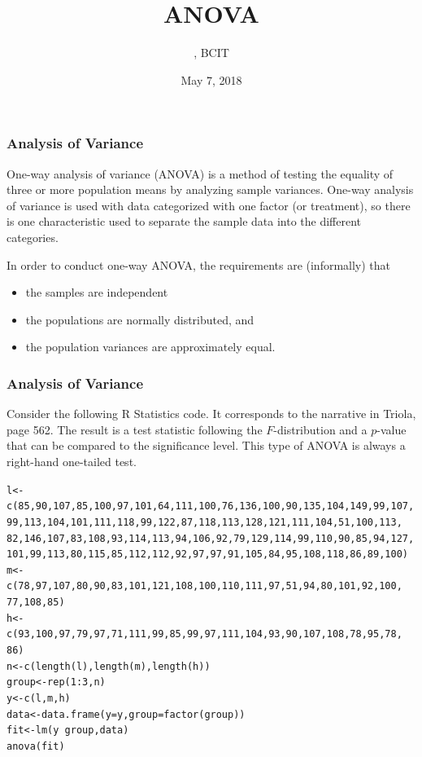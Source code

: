 \documentclass[xcolor=dvipsnames]{beamer}
\title{ANOVA}
\subtitle{{\CourseNumber}, BCIT}
\author{\CourseName}
\date{May 7, 2018}
\begin{document}
\begin{frame}
  \titlepage
\end{frame}

\begin{frame}
  \frametitle{Analysis of Variance}
One-way analysis of variance (ANOVA) is a method of testing the
equality of three or more population means by analyzing sample
variances. One-way analysis of variance is used with data categorized
with one factor (or treatment), so there is one characteristic used to
separate the sample data into the different categories.

\bigskip

In order to conduct one-way ANOVA, the requirements are (informally)
that
\begin{itemize}
\item the samples are independent
\item the populations are normally distributed, and
\item the population variances are approximately equal.
\end{itemize}
\end{frame}

\begin{frame}[fragile]
  \frametitle{Analysis of Variance}
  Consider the following R Statistics code. It corresponds to the
  narrative in Triola, page 562. The result is a test statistic
  following the $F$-distribution and a $p$-value that can be compared
  to the significance level. This type of ANOVA is always a right-hand
  one-tailed test.
\begin{scriptsize}
\begin{alltt}
l<-c(85,90,107,85,100,97,101,64,111,100,76,136,100,90,135,104,149,99,107,
  99,113,104,101,111,118,99,122,87,118,113,128,121,111,104,51,100,113,
  82,146,107,83,108,93,114,113,94,106,92,79,129,114,99,110,90,85,94,127,
  101,99,113,80,115,85,112,112,92,97,97,91,105,84,95,108,118,86,89,100)
m<-c(78,97,107,80,90,83,101,121,108,100,110,111,97,51,94,80,101,92,100,
  77,108,85)
h<-c(93,100,97,79,97,71,111,99,85,99,97,111,104,93,90,107,108,78,95,78,
  86)
n<-c(length(l),length(m),length(h))
group<-rep(1:3,n)
y<-c(l,m,h)
data<-data.frame(y=y,group=factor(group))
fit<-lm(y~group,data)
anova(fit)
\end{alltt}
\end{scriptsize}
\end{frame}
\end{document}
